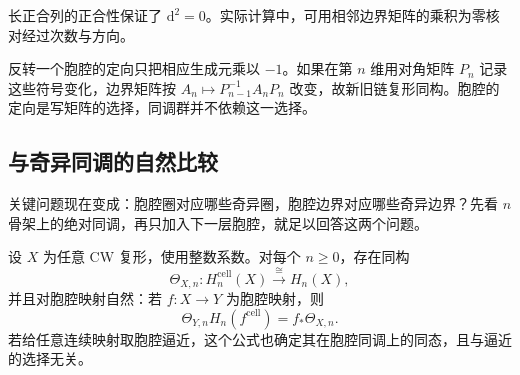 长正合列的正合性保证了 \(\mathrm{d}^2=0\)。实际计算中，可用相邻边界矩阵的乘积为零核对经过次数与方向。

\ProseParagraphBreak

反转一个胞腔的定向只把相应生成元乘以 \(-1\)。如果在第 \(n\) 维用对角矩阵 \(P_n\) 记录这些符号变化，边界矩阵按 \(A_n\mapsto P_{n-1}^{-1}A_nP_n\) 改变，故新旧链复形同构。胞腔的定向是写矩阵的选择，同调群并不依赖这一选择。

\subsection{与奇异同调的自然比较}
\label{g2:subsec:0301:04}
关键问题现在变成：胞腔圈对应哪些奇异圈，胞腔边界对应哪些奇异边界？先看 \(n\) 骨架上的绝对同调，再只加入下一层胞腔，就足以回答这两个问题。

\begin{theorem}[胞腔同调与奇异同调]\label{g2:thm:cellular-singular-comparison}
	设 \(X\) 为任意 CW 复形，使用整数系数。对每个 \(n\ge0\)，存在同构
	\[
		\Theta_{X,n}:H_n^{\mathrm{cell}}(X)\xrightarrow{\ \cong\ }H_n(X),
	\]
	并且对胞腔映射自然：若 \(f:X\to Y\) 为胞腔映射，则
	\[
		\Theta_{Y,n}H_n(f^{\mathrm{cell}})=f_*\Theta_{X,n}.
	\]
	若给任意连续映射取胞腔逼近，这个公式也确定其在胞腔同调上的同态，且与逼近的选择无关。
\end{theorem}
